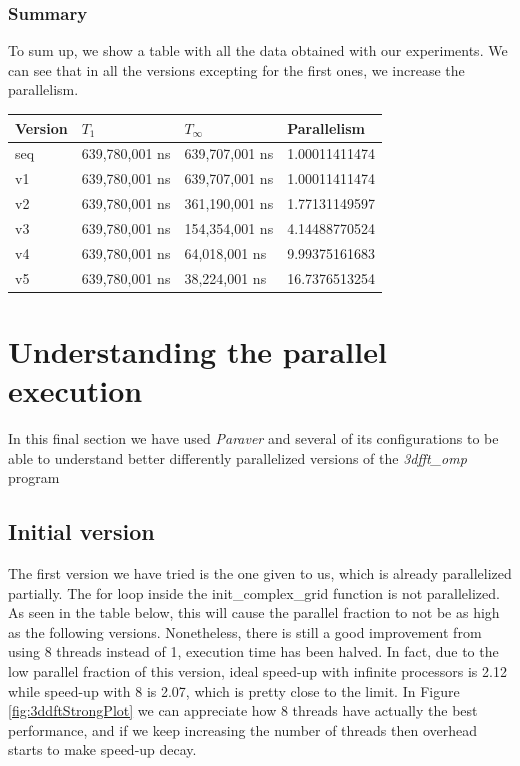 \documentclass[12]{article}
\begin{document}
\subsubsection{Summary}
To sum up, we show a table with all the data obtained with our experiments. We can see that in all the versions excepting for the first ones, we increase the parallelism.
\\
\medskip
\begin{table}[H]
\centering
\begin{tabular}{|l|l|l|l|}
\hline
Version & $T_1 $ & $T_\infty$ & Parallelism \\ \hline
seq     & 639,780,001 ns   & 639,707,001 ns    &        1.00011411474     \\ \hline
v1      &  639,780,001 ns  & 639,707,001 ns  &         1.00011411474      \\ \hline
v2      & 639,780,001 ns   & 361,190,001 ns   &      1.77131149597      \\ \hline
v3      & 639,780,001 ns   & 154,354,001 ns &         4.14488770524    \\ \hline
v4      & 639,780,001 ns   &  64,018,001 ns   &        9.99375161683     \\ \hline
v5      &639,780,001 ns     & 38,224,001 ns  &        16.7376513254    \\ \hline
\end{tabular}
\end{table}

\section{Understanding the parallel execution}
In this final section we have used \textit{Paraver} and several of its configurations to be able to understand better differently parallelized versions of the \textit{3dfft\_omp} program

\subsection{Initial version}
The first version we have tried is the one given to us, which is already parallelized partially. The for loop inside the init\_complex\_grid function is not parallelized. As seen in the table below, this will cause the parallel fraction to not be as high as the following versions. Nonetheless, there is still a good improvement from using 8 threads instead of 1, execution time has been halved. In fact, due to the low parallel fraction of this version, ideal speed-up with infinite processors is 2.12 while speed-up with 8 is 2.07, which is pretty close to the limit. In Figure \ref{fig:3ddftStrongPlot} we can appreciate how 8 threads have actually the best performance, and if we keep increasing the number of threads then overhead starts to make speed-up decay.
\end{document}
